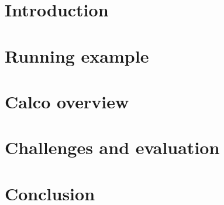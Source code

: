 \documentclass[sigconf]{acmart}
\theoremstyle{remark}
\begin{document}



\maketitle

\thispagestyle{empty}

\section{Introduction}


\section{Running example}


\section{Calco overview}


\section{Challenges and evaluation}


\section{Conclusion}




\end{document}
